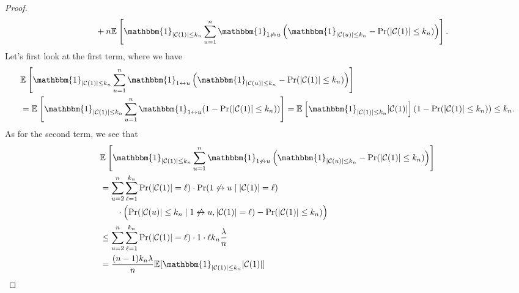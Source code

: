 \begin{proof}
\[\begin{split}
			 & \qquad + n \mathbb{E}_{}\left[\mathbbm{1}_{\lvert \mathcal{C} (1) \rvert \leq k_n} \sum_{u=1}^{n} \mathbbm{1}_{1 \not\leftrightarrow u} \left( \mathbbm{1}_{\lvert \mathcal{C} (u) \rvert \leq k_n} - \Pr_{}(\lvert \mathcal{C} (1) \rvert \leq k_n)  \right)  \right].
		\end{split}
	\]
	Let's first look at the first term, where we have
	\[
		\begin{split}
			 & \mathbb{E}_{}\left[\mathbbm{1}_{\lvert \mathcal{C} (1) \rvert \leq k_n} \sum_{u=1}^{n} \mathbbm{1}_{1 \leftrightarrow u} \left( \mathbbm{1}_{\lvert \mathcal{C} (u) \rvert \leq k_n} - \Pr_{}(\lvert \mathcal{C} (1) \rvert \leq k_n)  \right)  \right] \\
			 & = \mathbb{E}_{}\left[\mathbbm{1}_{\lvert \mathcal{C} (1) \rvert \leq k_n} \sum_{u=1}^{n} \mathbbm{1}_{1 \leftrightarrow u} (1 - \Pr_{}(\lvert \mathcal{C} (1) \rvert \leq k_n) ) \right]
			= \mathbb{E}_{}\left[\mathbbm{1}_{\lvert \mathcal{C} (1) \rvert \leq k_n} \lvert \mathcal{C} (1) \rvert \right] ( 1 - \Pr_{}(\lvert \mathcal{C} (1) \rvert \leq k_n) )
			\leq k_n.
		\end{split}
	\]
	As for the second term, we see that
	\[
		\begin{split}
			 & \mathbb{E}_{}\left[\mathbbm{1}_{\lvert \mathcal{C} (1) \rvert \leq k_n} \sum_{u=1}^{n} \mathbbm{1}_{1 \not\leftrightarrow u} \left( \mathbbm{1}_{\lvert \mathcal{C} (u) \rvert \leq k_n} - \Pr_{}(\lvert \mathcal{C} (1) \rvert \leq k_n)  \right)  \right] \\
			 & = \sum_{u=2}^{n} \sum_{\ell =1}^{k_n} \Pr_{}(\lvert \mathcal{C} (1) \rvert = \ell ) \cdot \Pr_{}(1 \not\leftrightarrow u \mid \lvert \mathcal{C} (1) \rvert = \ell )                                                                                        \\
			 & \qquad \cdot \left( \Pr_{}(\lvert \mathcal{C} (u) \rvert \leq k_n \mid 1 \not\leftrightarrow u, \lvert \mathcal{C} (1) \rvert = \ell ) - \Pr_{}(\lvert \mathcal{C} (1) \rvert \leq k_n) \right)                                                             \\
			 & \leq \sum_{u=2}^{n} \sum_{\ell =1}^{k_n} \Pr_{}(\lvert \mathcal{C} (1) \rvert = \ell ) \cdot 1 \cdot \ell k_n \frac{\lambda}{n}                                                                                                                             \\
			 & = \frac{(n-1) k_n \lambda}{n} \mathbb{E}_{}[\mathbbm{1}_{\lvert \mathcal{C} (1) \rvert \leq k_n} \lvert \mathcal{C} (1) \rvert ]

\end{split}\]
\end{proof}
